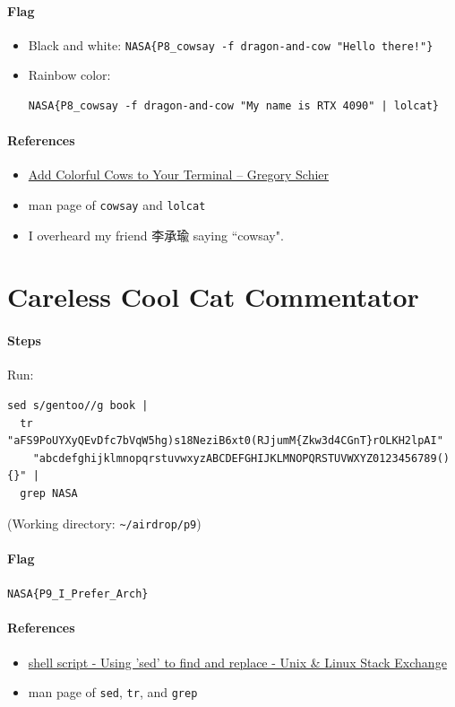 \documentclass[12pt, a4paper]{article}
\begin{document}
  \paragraph{Flag}
  \begin{itemize}
    \item Black and white: \verb|NASA{P8_cowsay -f dragon-and-cow "Hello there!"}|
    \item Rainbow color: \begin{verbatim}NASA{P8_cowsay -f dragon-and-cow "My name is RTX 4090" | lolcat}\end{verbatim}
  \end{itemize}
  \paragraph{References}
  \begin{itemize}
    \item \href{https://schier.co/blog/add-colorful-cows-to-your-terminal}{Add Colorful Cows to Your Terminal – Gregory Schier}
    \item man page of \verb|cowsay| and \verb|lolcat|
    \item I overheard my friend 李承瑜 saying ``cowsay".
  \end{itemize}

  \section{Careless Cool Cat Commentator}
  \paragraph{Steps} Run:
  \begin{verbatim}
sed s/gentoo//g book |
  tr "aFS9PoUYXyQEvDfc7bVqW5hg)s18NeziB6xt0(RJjumM{Zkw3d4CGnT}rOLKH2lpAI"
    "abcdefghijklmnopqrstuvwxyzABCDEFGHIJKLMNOPQRSTUVWXYZ0123456789(){}" |
  grep NASA
  \end{verbatim}
  (Working directory: \verb|~/airdrop/p9|)
  \paragraph{Flag} \verb|NASA{P9_I_Prefer_Arch}|
  \paragraph{References}
  \begin{itemize}
    \item \href{https://unix.stackexchange.com/questions/159367/using-sed-to-find-and-replace}{shell script - Using 'sed' to find and replace - Unix \& Linux Stack Exchange}
    \item man page of \verb|sed|, \verb|tr|, and \verb|grep|
  \end{itemize}
\end{document}
